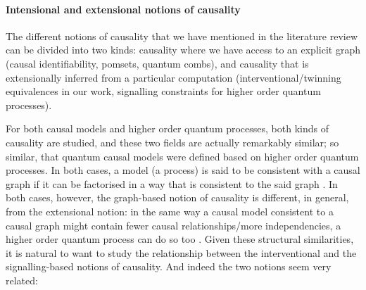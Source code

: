\documentclass[11pt,a4paper]{article}
\begin{document}
\paragraph{Intensional and extensional notions of causality} The different notions of causality that we have mentioned in the literature review can be divided into two kinds: causality where we have access to an explicit graph (causal identifiability, pomsets, quantum combs), and causality that is extensionally inferred from a particular computation (interventional/twinning equivalences in our work, signalling constraints for higher order quantum processes). 

For both causal models and higher order quantum processes, both kinds of causality are studied, and these two fields are actually remarkably similar; so similar, that quantum causal models \cite{barrett2020quantumcausalmodels} were defined based on higher order quantum processes. In both cases, a model (a process) is said to be consistent with a causal graph if it can be factorised in a way that is consistent to the said graph \cite{pearl2009causality,chiribella2009networks}. In both cases, however, the graph-based notion of causality is different, in general, from the extensional notion: in the same way a causal model consistent to a causal graph might contain fewer causal relationships/more independencies, a higher order quantum process can do so too \cite{barrett2020quantumcausalmodels}. Given these structural similarities, it is natural to want to study the relationship between the interventional and the signalling-based notions of causality. And indeed the two notions seem very related: 
\end{document}
